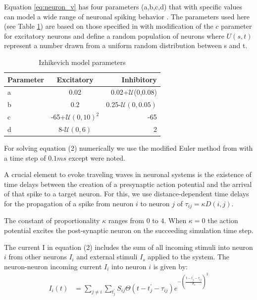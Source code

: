 \documentclass[12pt]{article}
\begin{document}
Equation \ref{eq:neuron_v} has four parameters (a,b,c,d) that with specific values can model a wide range of neuronal spiking behavior \parencite{izhikevich2003}. 
The parameters used here (see Table \ref{tab:izzy_params}) are based on those specified in \parencite{izhikevich2003} with modification of the $c$ parameter for excitatory neurons and define a random population of neurons where $U(s,t)$ represent a number drawn from a uniform random distribution between s and t. 
\begin{table}[!htb]
 \caption{Izhikevich model parameters}
 \label{tab:izzy_params}
 \centering
 \begin{tabular}{l|c|r}
  \textbf{Parameter} & \textbf{Excitatory} & \textbf{Inhibitory} \\
  \hline
  a & 0.02 & 0.02+$\mathcal{U}$(0,0.08) \\
  b & 0.2 & 0.25-$\mathcal{U}(0,0.05)$\\
  c & -65+$\mathcal{U}(0,10)^2$ & -65 \\
  d & 8-$\mathcal{U}(0,6)$& 2 \\
 \end{tabular}
\end{table}
For solving equation (2) numerically we use the modified Euler method from \parencite{izhikevich2003} with a time step of $0.1 ms$ except were noted. 

A crucial element to evoke traveling waves in neuronal systems is the existence of time delays between the creation of a presynaptic action potential and the arrival of that spike to a target neuron. 
For this, we use distance-dependent time delays for the propagation of a spike from neuron $i$ to neuron $j$ of $\tau_{ij} = \kappa  D(i,j)$. 
 
The constant of proportionality $\kappa$ ranges from $0$ to $4$.
When $\kappa=0$ the action potential excites the post-synaptic neuron on the succeeding simulation time step.
 
The current I in equation (2) includes the sum of all incoming stimuli into neuron $i$ from other neurons $I_i$ and external stimuli $I_s$ applied to the system. 
The neuron-neuron incoming current $I_i$ into neuron $i$ is given by:
\begin{align}
 I_i(t) &= \sum_{j\ne i} \sum_{t^\prime_j} S_{ij}  \Theta(t-t^\prime_j-\tau_{ij})e^{-(\frac{t-t^\prime_j-\tau_{ij}}{\sigma_s})^2}
\end{align}
\end{document}
